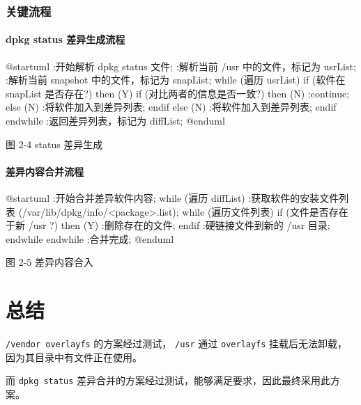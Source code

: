 \documentclass{utart}
\begin{document}
\subsubsection{关键流程}
\paragraph{dpkg status 差异生成流程}
\begin{center}
  \begin{adjustbox}{scale=0.85}
    \begin{plantuml}
      @startuml
      :开始解析 dpkg status 文件;
      :解析当前 /usr 中的文件，标记为 usrList;
      :解析当前 snapshot 中的文件，标记为 snapList;
      while (遍历 usrList)
      if (软件在 snapList 是否存在?) then (Y)
      if (对比两者的信息是否一致?) then (N)
      :continue;
      else (N)
      :将软件加入到差异列表;
      endif
      else (N)
      :将软件加入到差异列表;
      endif
      endwhile
      :返回差异列表，标记为 diffList;
      @enduml
    \end{plantuml}
  \end{adjustbox}

  图 2-4 status 差异生成
\end{center}

\paragraph{差异内容合并流程}
\begin{center}
  \begin{adjustbox}{scale=0.85}
    \begin{plantuml}
      @startuml
      :开始合并差异软件内容;
      while (遍历 diffList)
      :获取软件的安装文件列表
      (/var/lib/dpkg/info/<package>.list);
      while (遍历文件列表)
      if (文件是否存在于新 /usr ?) then (Y)
      :删除存在的文件;
      endif
      :硬链接文件到新的 /usr 目录;
      endwhile
      endwhile
      :合并完成;
      @enduml
    \end{plantuml}
  \end{adjustbox}

  图 2-5 差异内容合入
\end{center}

\section{总结}
\texttt{/vendor overlayfs} 的方案经过测试， \texttt{/usr} 通过 \texttt{overlayfs} 挂载后无法卸载，因为其目录中有文件正在使用。

而 \texttt{dpkg status} 差异合并的方案经过测试，能够满足要求，因此最终采用此方案。
\end{document}
